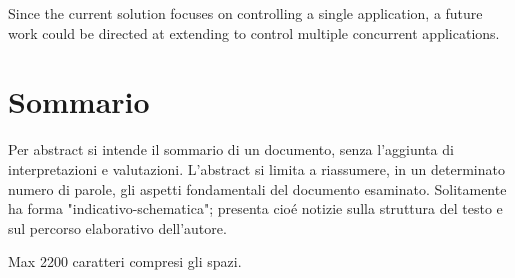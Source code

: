 Since the current solution focuses on controlling a single application, a future work could be directed at extending \tool to control multiple concurrent applications.

\vfill
\newpage
{}
\chapter*{Sommario}
Per abstract si intende il sommario di un documento, senza l'aggiunta di interpretazioni e valutazioni. L'abstract si limita a riassumere, in un determinato numero di parole, gli aspetti fondamentali del documento esaminato. Solitamente ha forma "indicativo-schematica"; presenta cioé notizie sulla struttura del testo e sul percorso elaborativo dell'autore.

Max 2200 caratteri compresi gli spazi.

\endgroup